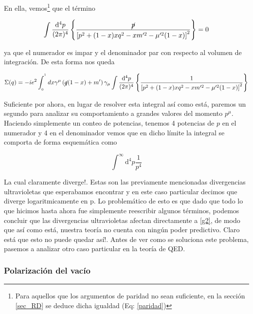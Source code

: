 \documentclass[tickz]{article}
\numberwithin{equation}{section}
\begin{document}
En ella, vemos\footnote{Para aquellos que los argumentos de paridad no sean suficiente, en la sección \ref{sec_RD} se deduce dicha igualdad (Eq: \ref{paridad})} que el término

\begin{equation}\label{key}
\int\frac{\mathrm{d^4}p}{(2\pi)^{4}}\left\{ \frac{\cancel{p} }{\left[p^{2}+(1-x)xq^{2}-xm'^{2}-\mu'^{2}(1-x)\right]^{2}}\right\}  = 0
\end{equation}

ya que el numerador es impar y el denominador par con respecto al volumen de integración. De esta forma nos queda

\begin{boxquation}
\begin{equation}\label{sigma}
\Sigma(q)=-ie^{2}\int_{_{0}}^{^{1}}dx \gamma^{\mu}\left(\cancel{q}(1-x)+m'\right) \gamma_{\mu} \int\frac{\mathrm{d^4}p}{(2\pi)^{4}}\left\{\frac{1}{\left[p^{2}+(1-x)xq^{2}-xm'^{2}-\mu'^{2}(1-x)\right]^{2}}\right\}
\end{equation}
\end{boxquation}

Suficiente por ahora, en lugar de resolver esta integral así como está, paremos un segundo para analizar su comportamiento a grandes valores del momento $ p^{\mu} $. Haciendo simplemente un conteo de potencias, tenemos 4 potencias de $ p $ en el numerador y 4 en el denominador vemos que en dicho límite la integral se comporta de forma esquemática como

\begin{equation}\label{key}
\int^{\infty} \mathrm{d^4}p \frac{1}{p^4}
\end{equation}

La cual claramente diverge!. Estas son las previamente mencionadas divergencias ultravioletas que esperabamos encontrar y en este caso particular decimos que diverge logaritmicamente en p. Lo problemático de esto es que dado que todo lo que hicimos hasta ahora fue simplemente reescribir algunos términos, podemos concluir que las divergencias ultravioletas afectan directamente a \ref{g2}, de modo que así como está, nuestra teoría no cuenta con ningún poder predictivo. Claro está que esto no puede quedar así!. Antes de ver como se soluciona este problema, pasemos a analizar otro caso particular en la teoría de QED.

\subsubsection{Polarización del vacío} 
\end{document}

